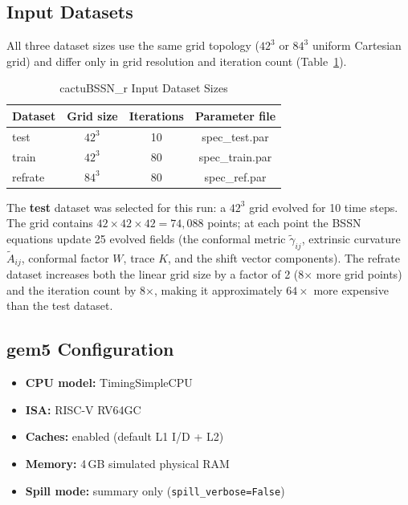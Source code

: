 \documentclass[conference]{IEEEtran}
\begin{document}
\subsection{Input Datasets}

All three dataset sizes use the same grid topology ($42^3$ or $84^3$
uniform Cartesian grid) and differ only in grid resolution and
iteration count (Table~\ref{tab:inputs}).

\begin{table}[H]
\centering
\caption{cactuBSSN\_r Input Dataset Sizes}
\label{tab:inputs}
\begin{tabular}{lccc}
\toprule
\textbf{Dataset} & \textbf{Grid size} & \textbf{Iterations} & \textbf{Parameter file} \\
\midrule
test    & $42^3$ & 10 & spec\_test.par \\
train   & $42^3$ & 80 & spec\_train.par \\
refrate & $84^3$ & 80 & spec\_ref.par \\
\bottomrule
\end{tabular}
\end{table}

The \textbf{test} dataset was selected for this run: a $42^3$ grid
evolved for 10 time steps. The grid contains $42 \times 42 \times 42 =
74{,}088$ points; at each point the BSSN equations update 25 evolved
fields (the conformal metric $\tilde{\gamma}_{ij}$, extrinsic curvature
$\tilde{A}_{ij}$, conformal factor $W$, trace $K$, and the shift vector
components). The refrate dataset increases both the linear grid size by
a factor of 2 (8$\times$ more grid points) and the iteration count by
8$\times$, making it approximately $64\times$ more expensive than the
test dataset.

\subsection{gem5 Configuration}

\begin{itemize}
    \item \textbf{CPU model:}   TimingSimpleCPU
    \item \textbf{ISA:}         RISC-V RV64GC
    \item \textbf{Caches:}      enabled (default L1 I/D + L2)
    \item \textbf{Memory:}      4\,GB simulated physical RAM
    \item \textbf{Spill mode:}  summary only (\texttt{spill\_verbose=False})
\end{itemize}
\end{document}
